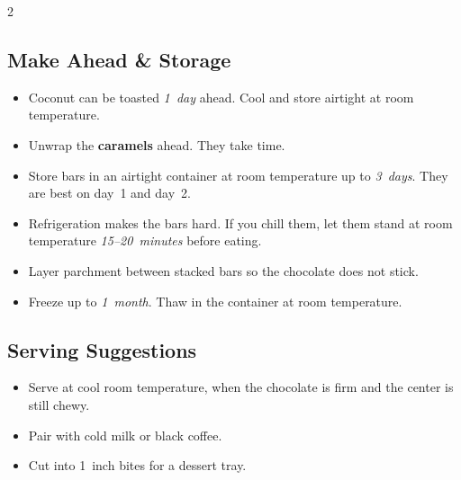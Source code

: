 \documentclass[11pt,letterpaper]{article}
\begin{document}
{\begin{multicols}{2}
\subsection*{Make Ahead \& Storage}
\begin{itemize}
    \item Coconut can be toasted \textit{1~day} ahead. Cool and store airtight at room temperature.
    \item Unwrap the \textbf{caramels} ahead. They take time.
    \item Store bars in an airtight container at room temperature up to \textit{3~days}. They are best on day~1 and day~2.
    \item Refrigeration makes the bars hard. If you chill them, let them stand at room temperature \textit{15--20~minutes} before eating.
    \item Layer parchment between stacked bars so the chocolate does not stick.
    \item Freeze up to \textit{1~month}. Thaw in the container at room temperature.
\end{itemize}

\subsection*{Serving Suggestions}
\begin{itemize}
    \item Serve at cool room temperature, when the chocolate is firm and the center is still chewy.
    \item Pair with cold milk or black coffee.
    \item Cut into 1~inch bites for a dessert tray.
\end{itemize}

\end{multicols}
}
\end{document}
